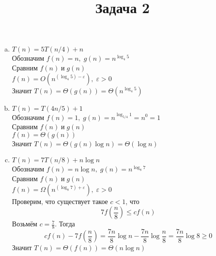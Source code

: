 \documentclass[12pt]{article}
\title{Задача 2}
\date{}
\begin{document}
	\large
	\maketitle
	\begin{enumerate}[a.]
		\item
			$T(n) = 5T(n/4) + n$\\
			Обозначим $f(n) = n,\; g(n) = n^{\log_4 5}$\\
			Сравним $f(n)\; и\; g(n)$\\
			$f(n) = O(n^{(\log _4 5)-\varepsilon}),\; \varepsilon>0 $\\
			Значит $T(n) = \Theta(g(n)) = \Theta(n^{\log_4 5})$
		\item
			$T(n) = T(4n/5) + 1$\\
			Обозначим $f(n) = 1,\; g(n) = n^{\log_{5/4} 1} = n^0 = 1$\\
			Сравним $f(n)\; и\; g(n)$\\
			$f(n) = \Theta(g(n))$\\
			Значит $T(n) = \Theta(g(n)\log n) = \Theta(\log n)$
		\item
			$T(n) = 7T(n/8) + n\log n$\\
			Обозначим $f(n) = n\log n,\; g(n) = n^{\log_8 7}$\\
			Сравним $f(n)\; и\; g(n)$\\
			$f(n) = \Omega(n^{(\log_8 7) + \varepsilon}),\; \varepsilon>0$\\
			Проверим, что существует такое $c < 1$, что
			$$7f(\frac{n}{8}) \le cf(n)$$
			Возьмём $c = \frac{7}{8}$. Тогда
			$$cf(n) - 7f(\frac{n}{8}) = \frac{7n}{8}\log n - \frac{7n}{8}\log\frac{n}{8} = \frac{7n}{8}\log 8 \ge 0$$
			Значит $T(n) = \Theta(f(n)) = \Theta(n\log n)$
	\end{enumerate}
\end{document}
